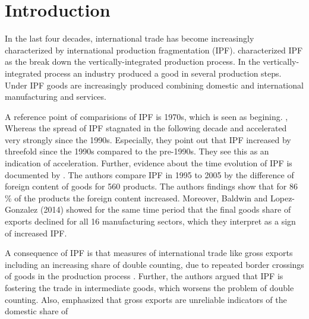 \chapter{Introduction}
\label{cha:Intro}
In the last four decades, international trade has become increasingly characterized by international production fragmentation (IPF).
\textcite{feenstra98} characterized IPF as the break down the vertically-integrated production process.
In the vertically-integrated process an industry produced a good in several production steps.
Under IPF goods are increasingly produced combining domestic and international manufacturing and services.  \par
A reference point of comparisions of IPF is 1970s, which is seen as begining. ,
Whereas the spread of IPF stagnated in the following decade and accelerated very strongly since the 1990s.
Especially, they point out that IPF increased by threefold since the 1990s compared to the pre-1990s.
They see this as an indication of acceleration.
Further, evidence about the time evolution of IPF is documented by \textcite{timmer_gvc}. The authors compare IPF in 1995 to 2005 by the difference of foreign content of goods for 560 products.
The authors findings show that for 86 \% of the products the foreign content increased.
Moreover, Baldwin and Lopez-Gonzalez (2014) showed for the same time period that the final goods share of exports declined for all 16 manufacturing sectors, which they interpret as a sign of increased IPF.
\par %
A consequence of IPF is that measures of international trade like gross exports including an increasing share of double counting, due to repeated border crossings of goods in the production process \parencite{feenstra98}.
Further, the authors argued that IPF is fostering the trade in intermediate goods, which worsens the problem of double counting.
Also, \textcite{johnson}  emphasized that gross exports are unreliable indicators of the domestic share of
